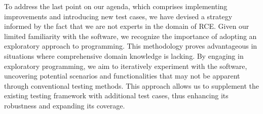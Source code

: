 To address the last point on our agenda, which comprises implementing improvements and introducing new test cases, we have devised a strategy informed by the fact that we are not experts in the domain of \ac{RCE}. Given our limited familiarity with the software, we recognize the importance of adopting an exploratory approach to programming. This methodology proves advantageous in situations where comprehensive domain knowledge is lacking. By engaging in exploratory programming, we aim to iteratively experiment with the software, uncovering potential scenarios and functionalities that may not be apparent through conventional testing methods. This approach allows us to supplement the existing testing framework with additional test cases, thus enhancing its robustness and expanding its coverage.